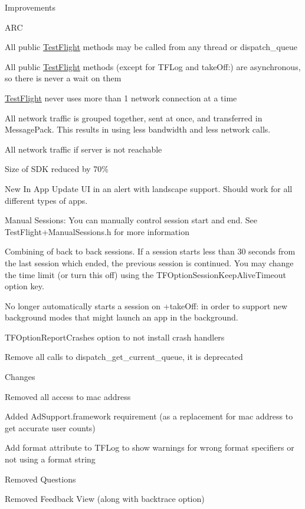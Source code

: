 Improvements


\begin{DoxyItemize}
\item A\-R\-C
\item All public \hyperlink{interface_test_flight}{Test\-Flight} methods may be called from any thread or dispatch\-\_\-queue
\item All public \hyperlink{interface_test_flight}{Test\-Flight} methods (except for {\ttfamily T\-F\-Log} and {\ttfamily take\-Off\-:}) are asynchronous, so there is never a wait on them
\item \hyperlink{interface_test_flight}{Test\-Flight} never uses more than 1 network connection at a time
\item All network traffic is grouped together, sent at once, and transferred in Message\-Pack. This results in using less bandwidth and less network calls.
\item All network traffic if server is not reachable
\item Size of S\-D\-K reduced by 70\%
\item New In App Update U\-I in an alert with landscape support. Should work for all different types of apps.
\item Manual Sessions\-: You can manually control session start and end. See {\ttfamily Test\-Flight+\-Manual\-Sessions.h} for more information
\item Combining of back to back sessions. If a session starts less than 30 seconds from the last session which ended, the previous session is continued. You may change the time limit (or turn this off) using the {\ttfamily T\-F\-Option\-Session\-Keep\-Alive\-Timeout} option key.
\item No longer automatically starts a session on {\ttfamily +take\-Off\-:} in order to support new background modes that might launch an app in the background.
\item {\ttfamily T\-F\-Option\-Report\-Crashes} option to not install crash handlers
\item Remove all calls to {\ttfamily dispatch\-\_\-get\-\_\-current\-\_\-queue}, it is deprecated
\end{DoxyItemize}

Changes


\begin{DoxyItemize}
\item Removed all access to mac address
\item Added Ad\-Support.\-framework requirement (as a replacement for mac address to get accurate user counts)
\item Add format attribute to T\-F\-Log to show warnings for wrong format specifiers or not using a format string
\item Removed Questions
\item Removed Feedback View (along with backtrace option)
\end{DoxyItemize}

